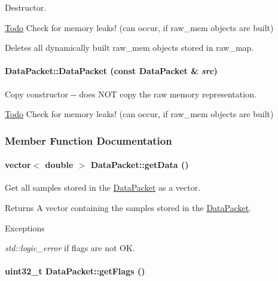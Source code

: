 Destructor. \begin{Desc}
\item[\hyperlink{todo__todo000003}{Todo}]Check for memory leaks! (can occur, if raw\_\-mem objects are built)\end{Desc}
Deletes all dynamically built raw\_\-mem objects stored in raw\_\-map. \hypertarget{class_data_packet_a0419e5f0113aad80d8c92f59bf990c26}{
\paragraph[{DataPacket}]{\setlength{\rightskip}{0pt plus 5cm}DataPacket::DataPacket (const {\bf DataPacket} \& {\em src})}\hfill}
\label{class_data_packet_a0419e5f0113aad80d8c92f59bf990c26}


Copy constructor -\/-\/ does NOT copy the raw memory representation. \begin{Desc}
\item[\hyperlink{todo__todo000004}{Todo}]Check for memory leaks! (can occur, if raw\_\-mem objects are built) \end{Desc}


\subsubsection{Member Function Documentation}
\hypertarget{class_data_packet_ae12c2a5fae637439431ddd66376ff797}{
\paragraph[{getData}]{\setlength{\rightskip}{0pt plus 5cm}vector$<$ double $>$ DataPacket::getData ()}\hfill}
\label{class_data_packet_ae12c2a5fae637439431ddd66376ff797}


Get all samples stored in the \hyperlink{class_data_packet}{DataPacket} as a vector. \begin{DoxyReturn}{Returns}
A vector containing the samples stored in the \hyperlink{class_data_packet}{DataPacket}. 
\end{DoxyReturn}

\begin{DoxyExceptions}{Exceptions}
\item[{\em std::logic\_\-error}]if flags are not OK. \end{DoxyExceptions}
\hypertarget{class_data_packet_ab4bd49f2f36a2a15bc37235f388c33d1}{
\paragraph[{getFlags}]{\setlength{\rightskip}{0pt plus 5cm}uint32\_\-t DataPacket::getFlags ()}\hfill}
\label{class_data_packet_ab4bd49f2f36a2a15bc37235f388c33d1}


